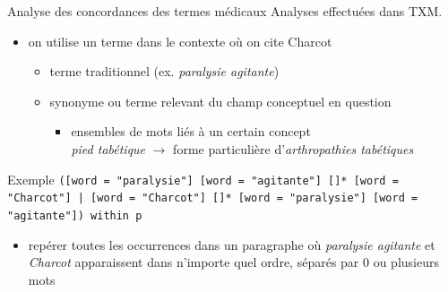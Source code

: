 \documentclass[xcolor={table,usenames,dvipsnames}]{beamer}
\let\olditem\item
\renewcommand{\item}{%
\olditem\vspace{0pt}}
\newcommand{\bolder}[1]{{\color{purple}\bfseries#1}}
\let\oldfootnotesize\footnotesize
\renewcommand*{\footnotesize}{\oldfootnotesize\scriptsize}
\begin{document}
\begin{frame}{Analyse des concordances des termes médicaux}
	Analyses effectuées dans \textsc{TXM}.
	\begin{itemize}
		\item on utilise un terme dans le contexte où on cite Charcot
		\begin{itemize}
			\item terme traditionnel (ex. \textit{paralysie agitante})
			\item synonyme ou terme relevant du champ conceptuel en question
			\begin{itemize}
				\item ensembles de mots liés à un certain concept \citep{costachescu2024}\\
				\textit{pied tabétique} $\rightarrow$ forme particulière d'\textit{arthropathies tabétiques}
			\end{itemize}
		\end{itemize}
	\end{itemize}
	\begin{alertblock}{Exemple}
		\texttt{([word = "paralysie"] [word = "agitante"] []* [word = "Charcot"] | [word = "Charcot"] []* [word = "paralysie"] [word = "agitante"]) within p}
				\begin{itemize}
					\item repérer toutes les occurrences dans un paragraphe où \textit{paralysie agitante} et \textit{Charcot} apparaissent dans n'importe quel ordre, séparés par 0 ou plusieurs mots
		\end{itemize}
	\end{alertblock}
\end{frame}
%	
%	
\end{document}
